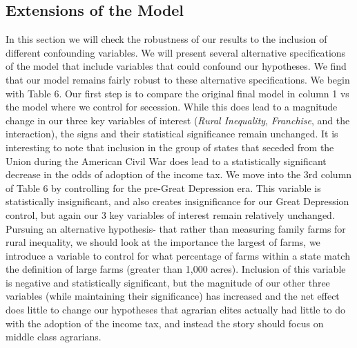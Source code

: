 \documentclass[letter, 12pt]{article}
\begin{document}
 
 \subsection{Extensions of the Model}
 
 In this section we will check the robustness of our results to the inclusion of different confounding variables. We will present several alternative specifications of the model that include variables that could confound our hypotheses. We find that our model remains fairly robust to these alternative specifications. We begin with Table 6. Our first step is to compare the original final model in column 1 vs the model where we control for secession. While this does lead to a magnitude change in our three key variables of interest (\emph{Rural Inequality}, \emph{Franchise}, and the interaction), the signs and their statistical significance remain unchanged. It is interesting to note that inclusion in the group of states that seceded from the Union during the American Civil War does lead to a statistically significant decrease in the odds of adoption of the income tax. We move into the 3rd column of Table 6 by controlling for the pre-Great Depression era. This variable is statistically insignificant, and also creates insignificance for our Great Depression control, but again our 3 key variables of interest remain relatively unchanged. Pursuing an alternative hypothesis- that rather than measuring family farms for rural inequality, we should look at the importance the largest of farms, we introduce a variable to control for what percentage of farms within a state match the definition of large farms (greater than 1,000 acres). Inclusion of this variable is negative and statistically significant, but the magnitude of our other three variables (while maintaining their significance) has increased and the net effect does little to change our hypotheses that agrarian elites actually had little to do with the adoption of the income tax, and instead the story should focus on middle class agrarians.
 
\end{document}
